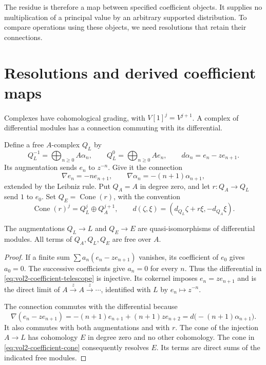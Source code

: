 The residue is therefore a map between specified coefficient objects.
It supplies no multiplication of a principal value by an arbitrary
supported distribution. To compare operations using these objects,
we need resolutions that retain their connections.

\section{Resolutions and derived coefficient maps}
\label{sec:vol2-coefficient-resolutions}

Complexes have cohomological grading, with $V[1]^j=V^{j+1}$.
A complex of differential modules has a connection commuting with
its differential.

Define a free $A$-complex $Q_L$ by
\begin{equation}\label{eq:vol2-coefficient-telescope}
 Q_L^{-1}=\bigoplus_{n\geq0}A\alpha_n,\qquad
 Q_L^0=\bigoplus_{n\geq0}Ae_n,\qquad
 d\alpha_n=e_n-ze_{n+1}.
\end{equation}
Its augmentation sends $e_n$ to $z^{-n}$. Give it the connection
\begin{equation}\label{eq:vol2-telescope-connection}
 \nabla e_n=-ne_{n+1},\qquad
 \nabla\alpha_n=-(n+1)\alpha_{n+1},
\end{equation}
extended by the Leibniz rule. Put $Q_A=A$ in degree zero, and let
$r:Q_A\to Q_L$ send $1$ to $e_0$. Set $Q_E=\operatorname{Cone}(r)$,
with the convention
\begin{equation}\label{eq:vol2-coefficient-cone}
 \operatorname{Cone}(r)^j=Q_L^j\oplus Q_A^{j+1},\qquad
 d(\zeta,\xi)=(d_{Q_L}\zeta+r\xi,-d_{Q_A}\xi).
\end{equation}

\begin{lemma}\label{lem:vol2-coefficient-telescope}
The augmentations $Q_L\to L$ and $Q_E\to E$ are
quasi-isomorphisms of differential modules. All terms of $Q_A,Q_L,Q_E$
are free over $A$.
\end{lemma}

\begin{proof}
If a finite sum $\sum a_n(e_n-ze_{n+1})$ vanishes, its coefficient
of $e_0$ gives $a_0=0$. The successive coefficients give $a_n=0$
for every $n$. Thus the differential in
\eqref{eq:vol2-coefficient-telescope} is injective.
Its cokernel imposes $e_n=ze_{n+1}$ and is the direct limit
of $A\xrightarrow{z}A\xrightarrow{z}\cdots$, identified with $L$
by $e_n\mapsto z^{-n}$.

The connection commutes with the differential because
\[
 \nabla(e_n-ze_{n+1})
 =-(n+1)e_{n+1}+(n+1)ze_{n+2}
 =d\bigl(-(n+1)\alpha_{n+1}\bigr).
\]
It also commutes with both augmentations and with $r$.
The cone of the injection $A\to L$ has cohomology $E$ in degree
zero and no other cohomology. The cone in
\eqref{eq:vol2-coefficient-cone} consequently resolves $E$.
Its terms are direct sums of the indicated free modules.
\end{proof}

